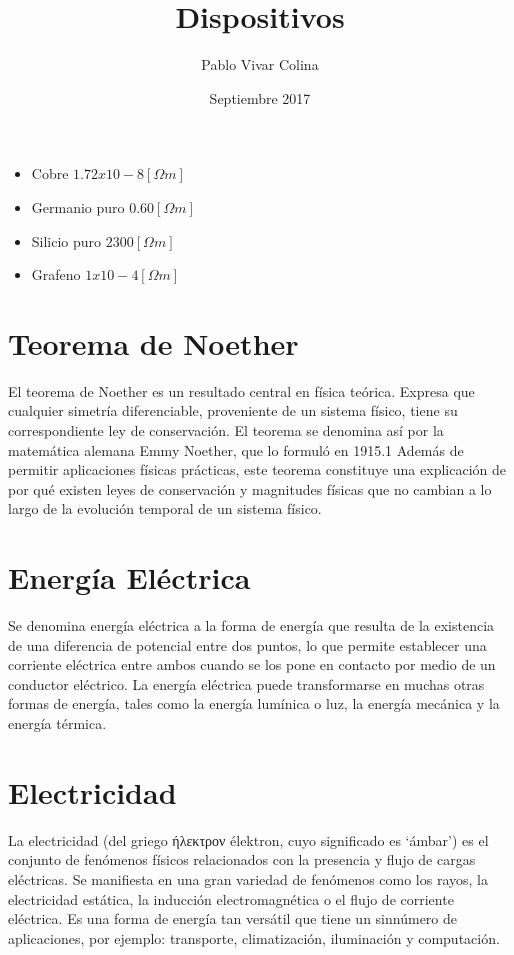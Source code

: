 \documentclass{article}
\title{Dispositivos}
\author{Pablo Vivar Colina}
\date{Septiembre 2017}
\begin{document}
\begin{itemize}
    \item Cobre $1.72 x 10-8 [\Omega m]$ \citep{RS}
    \item Germanio puro  $0.60 [\Omega m]$ \citep{RS}
\item Silicio puro $2300 [\Omega m]$ \citep{RS}
\item  Grafeno $1 x 10-4 [\Omega m]$ \citep{Graf}
\end{itemize}


\section{Teorema de Noether}

El teorema de Noether es un resultado central en física teórica. Expresa que cualquier simetría diferenciable, proveniente de un sistema físico, tiene su correspondiente ley de conservación. El teorema se denomina así por la matemática alemana Emmy Noether, que lo formuló en 1915.1​ Además de permitir aplicaciones físicas prácticas, este teorema constituye una explicación de por qué existen leyes de conservación y magnitudes físicas que no cambian a lo largo de la evolución temporal de un sistema físico.

\section{Energía Eléctrica}

Se denomina energía eléctrica a la forma de energía que resulta de la existencia de una diferencia de potencial entre dos puntos, lo que permite establecer una corriente eléctrica entre ambos cuando se los pone en contacto por medio de un conductor eléctrico. La energía eléctrica puede transformarse en muchas otras formas de energía, tales como la energía lumínica o luz, la energía mecánica y la energía térmica.\citep{EE}

\section{Electricidad}

La electricidad (del griego ήλεκτρον élektron, cuyo significado es ‘ámbar’) es el conjunto de fenómenos físicos relacionados con la presencia y flujo de cargas eléctricas. Se manifiesta en una gran variedad de fenómenos como los rayos, la electricidad estática, la inducción electromagnética o el flujo de corriente eléctrica. Es una forma de energía tan versátil que tiene un sinnúmero de aplicaciones, por ejemplo: transporte, climatización, iluminación y computación.\citep{Elec}
\end{document}
